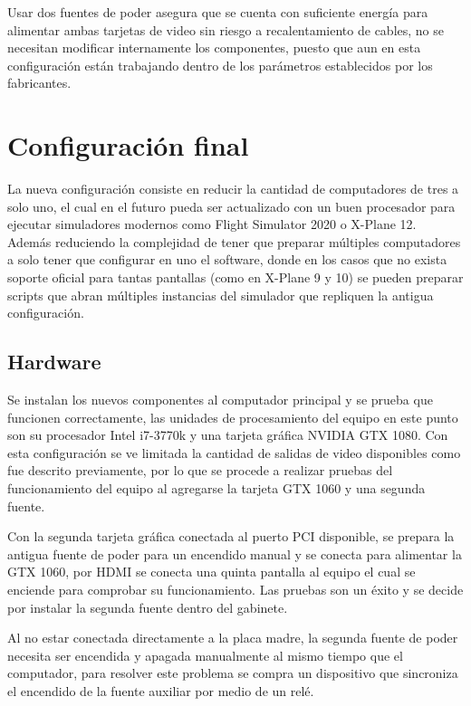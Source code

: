 Usar dos fuentes de poder asegura que se cuenta con suficiente energía para alimentar ambas tarjetas de video sin riesgo a recalentamiento de cables, no se necesitan modificar internamente los componentes, puesto que aun en esta configuración están trabajando dentro de los parámetros establecidos por los fabricantes.

\section{Configuración final}

La nueva configuración consiste en reducir la cantidad de computadores de tres a solo uno, el cual en el futuro pueda ser actualizado con un buen procesador para ejecutar simuladores modernos como Flight Simulator 2020 o X-Plane 12. Además reduciendo la complejidad de tener que preparar múltiples computadores a solo tener que configurar en uno el software, donde en los casos que no exista soporte oficial para tantas pantallas (como en X-Plane 9 y 10) se pueden preparar scripts que abran múltiples instancias del simulador que repliquen la antigua configuración.

\subsection{Hardware}

Se instalan los nuevos componentes al computador principal y se prueba que funcionen correctamente, las unidades de procesamiento del equipo en este punto son su procesador Intel i7-3770k y una tarjeta gráfica NVIDIA GTX 1080. Con esta configuración se ve limitada la cantidad de salidas de video disponibles como fue descrito previamente, por lo que se procede a realizar pruebas del funcionamiento del equipo al agregarse la tarjeta GTX 1060 y una segunda fuente.

Con la segunda tarjeta gráfica conectada al puerto PCI disponible, se prepara la antigua fuente de poder para un encendido manual \cite{psumanual} y se conecta para alimentar la GTX 1060, por HDMI se conecta una quinta pantalla al equipo el cual se enciende para comprobar su funcionamiento. Las pruebas son un éxito y se decide por instalar la segunda fuente dentro del gabinete.

Al no estar conectada directamente a la placa madre, la segunda fuente de poder necesita ser encendida y apagada manualmente al mismo tiempo que el computador, para resolver este problema se compra un dispositivo que sincroniza el encendido de la fuente auxiliar por medio de un relé.

